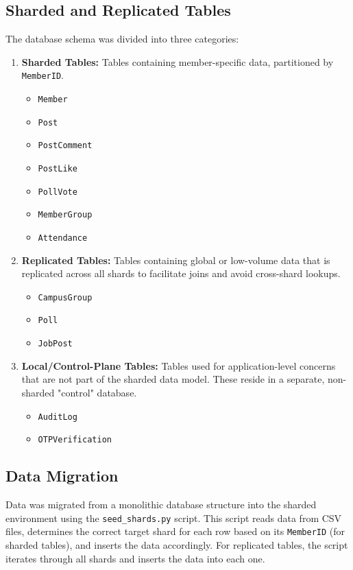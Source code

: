 \documentclass{article}
\begin{document}
\subsection{Sharded and Replicated Tables}
The database schema was divided into three categories:
\begin{enumerate}
    \item \textbf{Sharded Tables:} Tables containing member-specific data, partitioned by \texttt{MemberID}.
    \begin{itemize}
        \item \texttt{Member}
        \item \texttt{Post}
        \item \texttt{PostComment}
        \item \texttt{PostLike}
        \item \texttt{PollVote}
        \item \texttt{MemberGroup}
        \item \texttt{Attendance}
    \end{itemize}
    \item \textbf{Replicated Tables:} Tables containing global or low-volume data that is replicated across all shards to facilitate joins and avoid cross-shard lookups.
    \begin{itemize}
        \item \texttt{CampusGroup}
        \item \texttt{Poll}
        \item \texttt{JobPost}
    \end{itemize}
    \item \textbf{Local/Control-Plane Tables:} Tables used for application-level concerns that are not part of the sharded data model. These reside in a separate, non-sharded "control" database.
    \begin{itemize}
        \item \texttt{AuditLog}
        \item \texttt{OTPVerification}
    \end{itemize}
\end{enumerate}

\subsection{Data Migration}
Data was migrated from a monolithic database structure into the sharded environment using the \texttt{seed\_shards.py} script. This script reads data from CSV files, determines the correct target shard for each row based on its \texttt{MemberID} (for sharded tables), and inserts the data accordingly. For replicated tables, the script iterates through all shards and inserts the data into each one.
\end{document}
